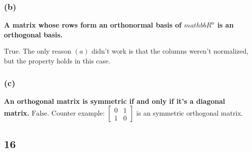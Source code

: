 \documentclass[10pt,letterpaper]{article}
\begin{document}
	\subsubsection*{(b)} \textbf{A matrix whose rows form an orthonormal basis of $mathbb{R}^n$ is an orthogonal basis. } 
	
	$\boxed{\text{True}}$. The only reason $(a)$ didn't work is that the columns weren't normalized, but the property holds in this case. 
	\subsubsection*{(c)} \textbf{An orthogonal matrix is symmetric if and only if it's a diagonal matrix. }
	$\boxed{\text{False}}$. Counter example: $\begin{bmatrix}
	0 & 1 \\ 1 & 0 
	\end{bmatrix}$ is an symmetric orthogonal matrix. 
	\subsection*{16} 
\end{document}
